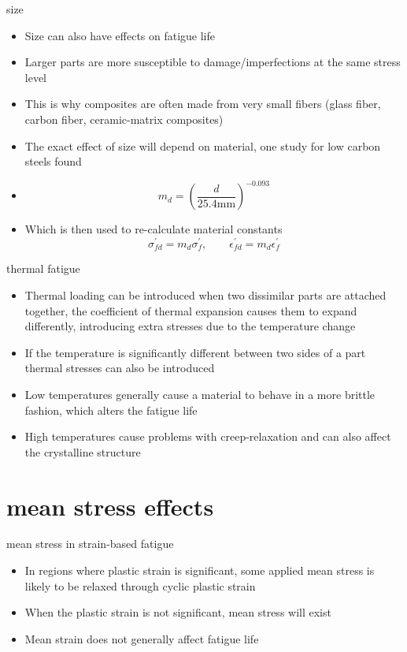\documentclass[10pt]{beamer}
\begin{document}
\begin{frame}{size}
	\begin{itemize}[<+->]
		\item Size can also have effects on fatigue life
		\item Larger parts are more susceptible to damage/imperfections at the same stress level
		\item This is why composites are often made from very small fibers (glass fiber, carbon fiber, ceramic-matrix composites)
		\item The exact effect of size will depend on material, one study for low carbon steels found
		\item[] \begin{equation}
		m_d = \left(\frac{d}{25.4 \text{mm}}\right)^{-0.093}
		\end{equation}
		\item Which is then used to re-calculate material constants
		\begin{equation}
		\sigma_{fd}^\prime = m_d \sigma_f^\prime, \qquad \epsilon_{fd}^\prime = m_d \epsilon_f^\prime
		\end{equation}
	\end{itemize}
\end{frame}

\begin{frame}{thermal fatigue}
	\begin{itemize}[<+->]
		\item Thermal loading can be introduced when two dissimilar parts are attached together, the coefficient of thermal expansion causes them to expand differently, introducing extra stresses due to the temperature change
		\item If the temperature is significantly different between two sides of a part thermal stresses can also be introduced
		\item Low temperatures generally cause a material to behave in a more brittle fashion, which alters the fatigue life
		\item High temperatures cause problems with creep-relaxation and can also affect the crystalline structure
	\end{itemize}
\end{frame}

\section{mean stress effects}
\begin{frame}{mean stress in strain-based fatigue}
	\begin{itemize}[<+->]
		\item In regions where plastic strain is significant, some applied mean stress is likely to be relaxed through cyclic plastic strain
		\item When the plastic strain is not significant, mean stress will exist
		\item Mean strain does not generally affect fatigue life
	\end{itemize}
\end{frame}
\end{document}
